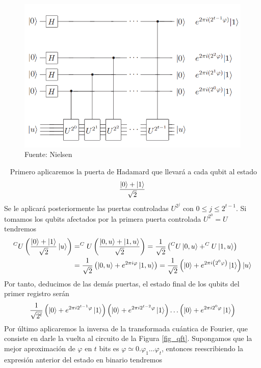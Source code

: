 \documentclass[a4paper]{article}
\numberwithin{equation}{section}
\begin{document}
\begin{figure}[h]
\centering
\includegraphics[scale=0.7]{orden}
\caption{Fuente: Nielsen \cite{nielsen2001quantum}}
\end{figure}\ \linebreak
Primero aplicaremos la puerta de Hadamard que llevará a cada qubit al estado
\begin{equation}
\frac{\ket{0} + \ket{1}}{\sqrt{2}}
\end{equation}
Se le aplicará posteriormente las puertas controladas $U^{2^j}$ con $0\leq j \leq 2^{t-1}$. Si tomamos los qubits afectados por la primera puerta controlada $U^{2^0} = U$ tendremos
\begin{equation}
\begin{split}
^CU \left( \frac{\ket{0} + \ket{1}}{\sqrt{2}} \ket{u} \right) 
&= 
^CU \left( \frac{\ket{0, u} + \ket{1, u}}{\sqrt{2}} \right)
=
\frac{1}{\sqrt{2}} \left( ^CU\ket{0, u} + ^CU\ket{1, u} \right)
\\ &=
\frac{1}{\sqrt{2}} \left( \ket{0, u} + e^{2\pi i \varphi}\ket{1, u} \right)
=
\frac{1}{\sqrt{2}} \left( \ket{0} + e^{2\pi i \left(2^0 \varphi\right)} \ket{1} \right) \ket{u}
\end{split}
\end{equation}
Por tanto, deducimos de las demás puertas, el estado final de los qubits del primer registro serán
\begin{equation}
\frac{1}{\sqrt{2^t}}
\left( \ket{0} + e^{2\pi i 2^{t-1}\varphi} \ket{1} \right)
\left( \ket{0} + e^{2\pi i 2^{t-2}\varphi} \ket{1} \right)
\ldots
\left( \ket{0} + e^{2\pi i 2^{0}\varphi} \ket{1} \right)
\end{equation}
Por último aplicaremos la inversa de la transformada cuántica de Fourier, que consiste en darle la vuelta al circuito de la Figura \ref{fig_qft}. Supongamos que la mejor aproximación de $\varphi$ en $t$ bits es $\varphi  \simeq 0.\varphi_1 \ldots \varphi_t$, entonces reescribiendo la expresión anterior del estado en binario tendremos
\end{document}
